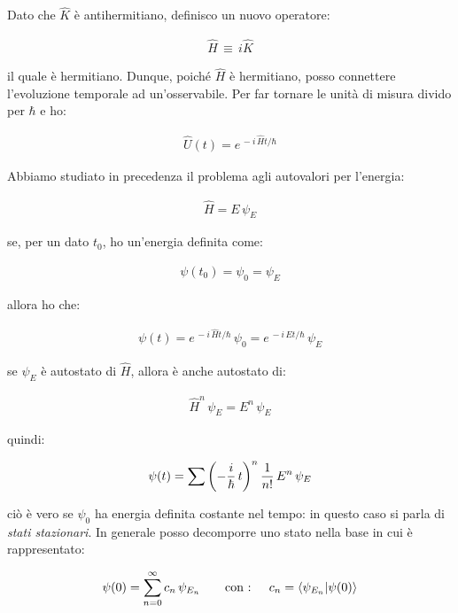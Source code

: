 	 Dato che $\hat{K}$ è antihermitiano, definisco un nuovo operatore:
	 
\begin{align*}
	\hat{H} \, \equiv \, i\hat{K}
\end{align*}

	il quale è hermitiano. Dunque, poiché $\hat{H}$ è hermitiano, posso connettere l'evoluzione temporale ad un'osservabile. Per far tornare le unità di misura divido per $\hbar$ e ho:
	
\begin{align*}
	\hat{U}(t) = e^{\, - i \, \hat{H}t /\hbar}
\end{align*}

	Abbiamo studiato in precedenza il problema agli autovalori per l'energia:
	
\begin{align*}
	\hat{H} = E \, \psi_E
\end{align*}

	se, per un dato $t_0$, ho un'energia definita come:
	
\begin{align*}
	\psi(t_0) = \psi_0 = \psi_E
\end{align*}

	allora ho che:
	
\begin{align*}
	\psi(t) = e^{\, - i \, \hat{H}t /\hbar} \,\psi_0 = e^{\, - i \, Et /\hbar} \, \psi_E
\end{align*}

	se $\psi_E$ è autostato di $\hat{H}$, allora è anche autostato di:

\begin{align*}
	\hat{H}^n \, \psi_E = E^n \, \psi_E
\end{align*}

	quindi:
	
\begin{align*}
	\psi(t) = \sum \qty(-\frac{i}{\hbar} \, t)^n \, \frac{1}{n!} \, E^n \, \psi_E
\end{align*}

	ciò è vero se $\psi_0$ ha energia definita costante nel tempo: in questo caso si parla di \textit{stati stazionari}. In generale posso decomporre uno stato nella base in cui è rappresentato:
	
\begin{align*}
	\psi(0) = \sum_{n = 0}^{\infty} c_n \, \psi_{E_n} \qquad \text{con : } \quad c_n = \braket{\psi_{E_n}}{\psi(0)}
\end{align*}

